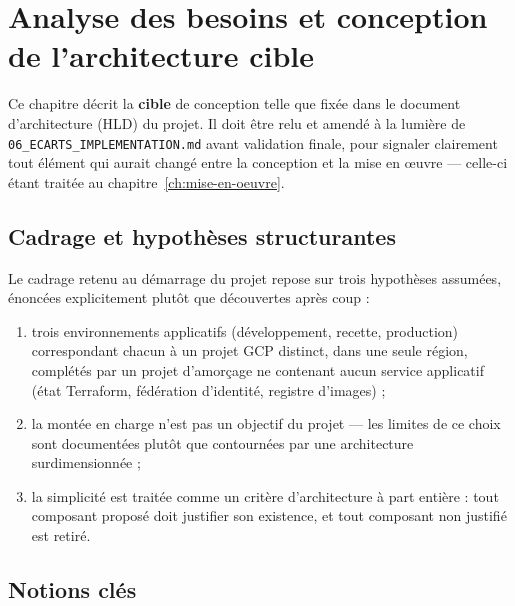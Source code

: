 \chapter{Analyse des besoins et conception de l'architecture cible}
\label{ch:conception}

\begin{attentedoc}
Ce chapitre décrit la \textbf{cible} de conception telle que fixée dans le document
d'architecture (HLD) du projet. Il doit être relu et amendé à la lumière de
\texttt{06\_ECARTS\_IMPLEMENTATION.md} avant validation finale, pour signaler clairement
tout élément qui aurait changé entre la conception et la mise en œuvre --- celle-ci étant
traitée au chapitre~\ref{ch:mise-en-oeuvre}.
\end{attentedoc}

\section{Cadrage et hypothèses structurantes}

Le cadrage retenu au démarrage du projet repose sur trois hypothèses assumées, énoncées
explicitement plutôt que découvertes après coup :

\begin{enumerate}
  \item trois environnements applicatifs (développement, recette, production) correspondant
        chacun à un projet GCP distinct, dans une seule région, complétés par un projet
        d'amorçage ne contenant aucun service applicatif (état Terraform, fédération
        d'identité, registre d'images) ;
  \item la montée en charge n'est pas un objectif du projet --- les limites de ce choix sont
        documentées plutôt que contournées par une architecture surdimensionnée ;
  \item la simplicité est traitée comme un critère d'architecture à part entière : tout
        composant proposé doit justifier son existence, et tout composant non justifié est
        retiré.
\end{enumerate}

\section{Notions clés}

